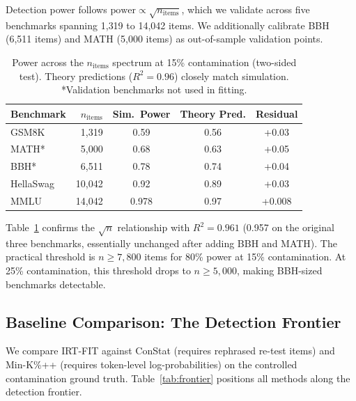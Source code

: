\documentclass[11pt,a4paper]{article}
\begin{document}
Detection power follows $\text{power} \propto \sqrt{n_{\text{items}}}$, which we validate across five benchmarks spanning 1{,}319 to 14{,}042 items. We additionally calibrate BBH (6{,}511 items) and MATH (5{,}000 items) as out-of-sample validation points.

\begin{table}[t]
\centering
\small
\caption{Power across the $n_{\text{items}}$ spectrum at 15\% contamination (two-sided test). Theory predictions ($R^2=0.96$) closely match simulation. *Validation benchmarks not used in fitting.}
\label{tab:power_curve}
\begin{tabular}{lrccc}
\toprule
Benchmark & $n_{\text{items}}$ & Sim.\ Power & Theory Pred. & Residual \\
\midrule
GSM8K & 1{,}319 & 0.59 & 0.56 & +0.03 \\
MATH* & 5{,}000 & 0.68 & 0.63 & +0.05 \\
BBH* & 6{,}511 & 0.78 & 0.74 & +0.04 \\
HellaSwag & 10{,}042 & 0.92 & 0.89 & +0.03 \\
MMLU & 14{,}042 & 0.978 & 0.97 & +0.008 \\
\bottomrule
\end{tabular}
\end{table}

Table~\ref{tab:power_curve} confirms the $\sqrt{n}$ relationship with $R^2=0.961$ (0.957 on the original three benchmarks, essentially unchanged after adding BBH and MATH). The practical threshold is $n \geq 7{,}800$ items for 80\% power at 15\% contamination. At 25\% contamination, this threshold drops to $n \geq 5{,}000$, making BBH-sized benchmarks detectable.


\subsection{Baseline Comparison: The Detection Frontier}
\label{sec:baselines}

We compare IRT-FIT against ConStat (requires rephrased re-test items) and Min-K\%++ (requires token-level log-probabilities) on the controlled contamination ground truth. Table~\ref{tab:frontier} positions all methods along the detection frontier.
\end{document}
